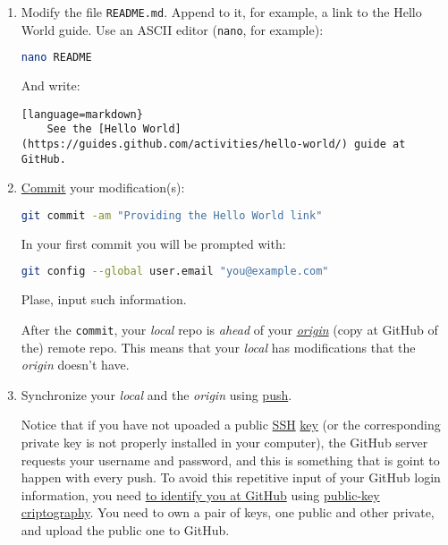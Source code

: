 \begin{enumerate}
\item Modify the file \texttt{README.md}. Append to it, for example, a
  link to the Hello World guide. Use an ASCII editor (\texttt{nano},
  for example):

  \begin{lstlisting}[language=bash]
    nano README
  \end{lstlisting}

  And write:
  
  \begin{lstlisting}[language=markdown}
    See the [Hello World](https://guides.github.com/activities/hello-world/) guide at GitHub.
  \end{lstlisting}
  
\item
  \href{https://docs.github.com/en/github/getting-started-with-github/github-glossary#commit}{Commit}
  your modification(s):

  \begin{lstlisting}[language=bash]
    git commit -am "Providing the Hello World link"
  \end{lstlisting}

  In your first commit you will be prompted with:

  \begin{lstlisting}[language=bash]
    git config --global user.email "you@example.com"
  \end{lstlisting}

  Plase, input such information.
  
  After the \texttt{commit}, your \emph{local} repo is \emph{ahead} of
  your
  \href{https://docs.github.com/en/github/getting-started-with-github/github-glossary#origin}{\emph{origin}}
  (copy at GitHub of the) remote repo. This means that your
  \emph{local} has modifications that the \emph{origin} doesn't have.

\item Synchronize your \emph{local} and the \emph{origin} using
  \href{https://docs.github.com/en/github/getting-started-with-github/github-glossary#push}{push}.

  Notice that if you have not upoaded a public
  \href{https://www.ssh.com/}{SSH}
  \href{https://www.ssh.com/ssh/identity-key}{key} (or the
  corresponding private key is not properly installed in your
  computer), the GitHub server requests your username and password,
  and this is something that is goint to happen with every push. To
  avoid this repetitive input of your GitHub login information, you
  need
  \href{https://docs.github.com/en/github/authenticating-to-github/connecting-to-github-with-ssh}{to
    identify you at GitHub} using
  \href{https://en.wikipedia.org/wiki/Public-key_cryptography}{public-key
    criptography}. You need to own a pair of keys, one public and
  other private, and upload the public one to GitHub.
  

\end{enumerate}
